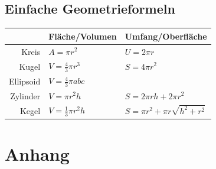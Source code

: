 \documentclass[a4paper, fontsize = 8pt, landscape]{scrartcl}
\begin{document}
\begin{multicols*}{3}
    \subsection{Einfache Geometrieformeln}

    \begin{center}
        \renewcommand{\arraystretch}{1.5}
        \begin{tabular}{r l l} \toprule
                      & Fläche/Volumen              & Umfang/Oberfläche                      \\
            \midrule
            Kreis     & $A = \pi r^2$               & $U = 2 \pi r$                          \\
            Kugel     & $V = \frac{4}{3} \pi r^3$   & $S = 4 \pi r^2$                        \\
            Ellipsoid & $V = \frac{4}{3} \pi a b c$ &                                        \\
            Zylinder  & $V = \pi r^2 h $            & $S = 2\pi r h + 2\pi r^2$              \\
            Kegel     & $V = \frac{1}{3} \pi r^2 h$ & $S = \pi r^2 + \pi r \sqrt{h^2 + r^2}$ \\
            \bottomrule
        \end{tabular}
    \end{center}
    \section*{Anhang}


\end{multicols*}
\end{document}
